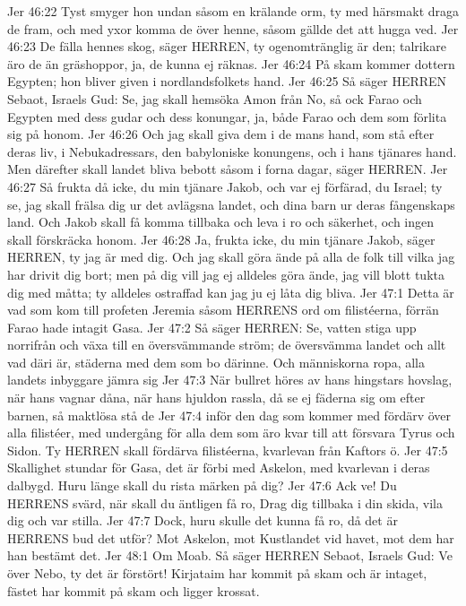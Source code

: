 Jer 46:22  Tyst smyger hon undan såsom en krälande orm, ty med härsmakt draga de fram, och med yxor komma de över henne, såsom gällde det att hugga ved.
Jer 46:23  De fälla hennes skog, säger HERREN, ty ogenomtränglig är den; talrikare äro de än gräshoppor, ja, de kunna ej räknas.
Jer 46:24  På skam kommer dottern Egypten; hon bliver given i nordlandsfolkets hand.
Jer 46:25  Så säger HERREN Sebaot, Israels Gud: Se, jag skall hemsöka Amon från No, så ock Farao och Egypten med dess gudar och dess konungar, ja, både Farao och dem som förlita sig på honom.
Jer 46:26  Och jag skall giva dem i de mans hand, som stå efter deras liv, i Nebukadressars, den babyloniske konungens, och i hans tjänares hand. Men därefter skall landet bliva bebott såsom i forna dagar, säger HERREN.
Jer 46:27  Så frukta då icke, du min tjänare Jakob, och var ej förfärad, du Israel; ty se, jag skall frälsa dig ur det avlägsna landet, och dina barn ur deras fångenskaps land. Och Jakob skall få komma tillbaka och leva i ro och säkerhet, och ingen skall förskräcka honom.
Jer 46:28  Ja, frukta icke, du min tjänare Jakob, säger HERREN, ty jag är med dig. Och jag skall göra ände på alla de folk till vilka jag har drivit dig bort; men på dig vill jag ej alldeles göra ände, jag vill blott tukta dig med måtta; ty alldeles ostraffad kan jag ju ej låta dig bliva.
Jer 47:1  Detta är vad som kom till profeten Jeremia såsom HERRENS ord om filistéerna, förrän Farao hade intagit Gasa.
Jer 47:2  Så säger HERREN: Se, vatten stiga upp norrifrån och växa till en översvämmande ström; de översvämma landet och allt vad däri är, städerna med dem som bo därinne. Och människorna ropa, alla landets inbyggare jämra sig
Jer 47:3  När bullret höres av hans hingstars hovslag, när hans vagnar dåna, när hans hjuldon rassla, då se ej fäderna sig om efter barnen, så maktlösa stå de
Jer 47:4  inför den dag som kommer med fördärv över alla filistéer, med undergång för alla dem som äro kvar till att försvara Tyrus och Sidon. Ty HERREN skall fördärva filistéerna, kvarlevan från Kaftors ö.
Jer 47:5  Skallighet stundar för Gasa, det är förbi med Askelon, med kvarlevan i deras dalbygd. Huru länge skall du rista märken på dig?
Jer 47:6  Ack ve! Du HERRENS svärd, när skall du äntligen få ro, Drag dig tillbaka i din skida, vila dig och var stilla.
Jer 47:7  Dock, huru skulle det kunna få ro, då det är HERRENS bud det utför? Mot Askelon, mot Kustlandet vid havet, mot dem har han bestämt det.
Jer 48:1  Om Moab. Så säger HERREN Sebaot, Israels Gud: Ve över Nebo, ty det är förstört! Kirjataim har kommit på skam och är intaget, fästet har kommit på skam och ligger krossat.
